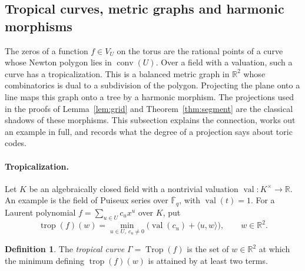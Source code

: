 \documentclass[12pt,letterpaper]{article}
\numberwithin{equation}{section}
\theoremstyle{definition}
\newtheorem{definition}[theorem]{Definition}
\theoremstyle{remark}
\DeclareMathOperator{\conv}{conv}
\newcommand{\F}{\mathbb{F}}
\newcommand{\R}{\mathbb{R}}
\begin{document}
\subsection{Tropical curves, metric graphs and harmonic morphisms}\label{sec:tropical}

The zeros of a function $f\in V_U$ on the torus are the rational points of a
curve whose Newton polygon lies in $\conv(U)$. Over a field with a valuation,
such a curve has a tropicalization. This is a balanced metric graph in $\R^2$
whose combinatorics is dual to a subdivision of the polygon. Projecting the
plane onto a line maps this graph onto a tree by a harmonic morphism. The
projections used in the proofs of Lemma~\ref{lem:grid} and
Theorem~\ref{thm:segment} are the classical shadows of these morphisms. This
subsection explains the connection, works out an example in full, and
records what the degree of a projection says about toric codes.

\paragraph{Tropicalization.}
Let $K$ be an algebraically closed field with a nontrivial valuation
$\operatorname{val}:K^\times\to\R$. An example is the field of Puiseux series
over $\overline{\F}_q$, with $\operatorname{val}(t)=1$. For a Laurent polynomial
$f=\sum_{u\in U}c_ux^u$ over $K$, put
\[
\operatorname{trop}(f)(w)=\min_{u\in U,\ c_u\ne0}\bigl(\operatorname{val}(c_u)+\langle
u,w\rangle\bigr),\qquad w\in\R^2 .
\]

\begin{definition}\label{def:tropcurve}
The \emph{tropical curve} $\Gamma=\operatorname{Trop}(f)$ is the set of
$w\in\R^2$ at which the minimum defining $\operatorname{trop}(f)(w)$ is
attained by at least two terms.
\end{definition}
\end{document}
